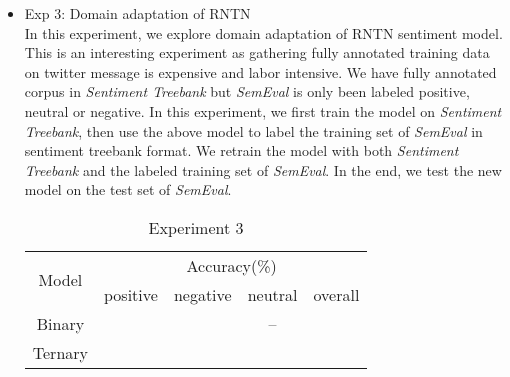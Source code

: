 \begin{itemize}
Another interesting comparison is the performance of RNTN in Table \ref{exp_1} and Table \ref{exp5_2_2}. Like statistical parser, RNTN model is also quite specific to the genre of the training corpus. To make the problem worse, the Stanford parse doesn't work quite well on twitter message due to the noisy nature of it. 

\item Exp 3: Domain adaptation of RNTN\\
In this experiment, we explore domain adaptation of RNTN sentiment model. This is an interesting experiment as gathering fully annotated training data on twitter message is expensive and labor intensive. We have fully annotated corpus in \textit{Sentiment Treebank} but \textit{SemEval} is only been labeled positive, neutral or negative. In this experiment, we first train the model on \textit{Sentiment Treebank}, then use the above model to label the training set of \textit{SemEval} in sentiment treebank format. We retrain the model with both \textit{Sentiment Treebank} and the labeled  training set of \textit{SemEval}. In the end, we test the new model on the test set of \textit{SemEval}.




\begin{table}[H]
  \begin{center}
    \begin{tabular}{ccccc}\hline
      \multirow{2}{*}{Model} 
      & \multicolumn{4}{c}{Accuracy(\%)} \\\cline{2-5}
    & positive & negative & neutral & overall \\ \hline
    Binary  & ~        &   ~	   &   --         &    \\ 
    Ternary  & ~        &          &             &   \\ \hline
    \end{tabular}
    \end{center}
    \caption{\label{exp5_3} Experiment 3}
\end{table}

\end{itemize}








